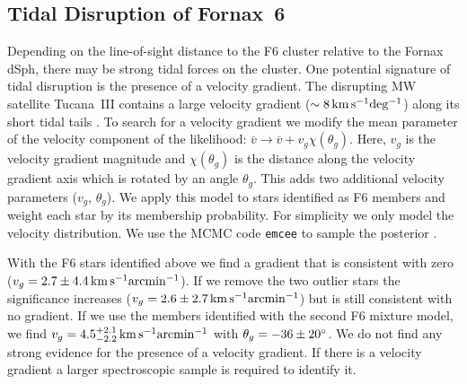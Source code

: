 \documentclass[twocolumn]{aastex63}
\begin{document}
\subsection{Tidal Disruption of Fornax~6}



Depending on the line-of-sight distance to the F6 cluster relative to the Fornax dSph, there may be strong tidal forces on the cluster.  One potential signature of tidal disruption is the presence of a velocity gradient.
The disrupting MW satellite Tucana~III contains a large velocity gradient ($\sim 8 \mathrm{\,km} \mathrm{\,s}^{-1} {\rm deg^{-1}}$) along its short tidal tails \citep{Li2018ApJ...866...22L}.
To search for a velocity gradient we modify the mean parameter of the velocity component of the likelihood: $\overline{v} \rightarrow \overline{v} + v_g \chi(\theta_g)$. Here, $v_g$ is the velocity gradient magnitude and $\chi(\theta_g)$ is the distance along the velocity gradient axis which is rotated by an angle $\theta_g$.
This adds two additional velocity parameters ($v_g$, $\theta_g$).
We  apply this model to stars identified as F6 members and weight each star by its membership probability.
For simplicity we only  model the velocity distribution.
We use the MCMC code \texttt{emcee} to sample the posterior \citep{ForemanMackey2013PASP..125..306F}. 

With the F6 stars identified above we find  a gradient that is consistent with zero ($v_g=2.7\pm4.4 \mathrm{\,km} \mathrm{\,s}^{-1} {\rm arcmin^{-1}}$).  If we remove the two outlier stars the significance increases ($v_g=2.6\pm2.7 \mathrm{\,km} \mathrm{\,s}^{-1} {\rm arcmin^{-1}}$) but is still consistent with no gradient. 
If we use the members identified with the second F6 mixture model, we find $v_g=4.5_{-2.2}^{+2.1} \mathrm{\,km} \mathrm{\,s}^{-1} {\rm arcmin^{-1}}$ with $\theta_g=-36\pm20{}^{\circ}$. 
We do not find any strong evidence for the presence of a velocity gradient.
If there is a velocity gradient a larger spectroscopic sample is required to identify it.
\end{document}
